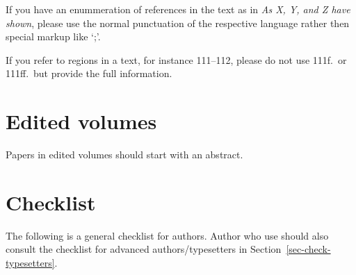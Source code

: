 
If you have an enummeration of references in the text as in \emph{As X, Y, and Z have shown}, please use
the normal punctuation of the respective language rather then special markup like `;'.

If you refer to regions in a text, for instance 111--112, please do not use 111f.\ or 111ff.\ but provide the
full information. 

\noindent
{}


\section{Edited volumes}

Papers in edited volumes should start with an abstract.


\section{Checklist}

The following is a general checklist for authors. Author who use \latex should also consult the
checklist for advanced authors/typesetters in Section~\ref{sec-check-typesetters}.



















